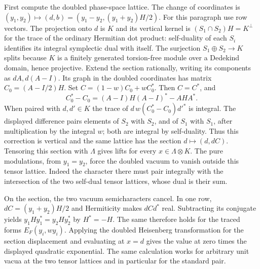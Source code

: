 First compute the doubled phase-space lattice. The change of
coordinates is $(y_1,y_2)\mapsto(d,b)=(y_1-y_2,(y_1+y_2)H/2)$.
For this paragraph use row vectors. The projection onto $d$ is
$K$ and its vertical kernel is $(S_1\cap S_2)H=K^\perp$ for
the trace of the ordinary Hermitian dot product: self-duality of
each $S_i$ identifies its integral symplectic dual with itself.
The surjection $S_1\oplus S_2\to K$ splits because $K$ is a
finitely generated torsion-free module over a Dedekind domain,
hence projective. Extend the section rationally, writing its
components as $dA,d(A-I)$. Its graph in the doubled coordinates
has matrix $C_0=(A-I/2)H$. Set $C=(1-w)C_0+wC_0^*$.
Then $C=C^*$, and
\[
 C_0^*-C_0=(A-I)H(A-I)^*-AHA^* .
\]
When paired with $d,d'\in K$ the trace of
$d\,w(C_0^*-C_0)d'^*$ is integral. The displayed difference
pairs elements of $S_2$ with $S_2$, and of $S_1$ with $S_1$,
after multiplication by the integral $w$; both are integral by
self-duality. Thus this correction is vertical and the same
lattice has the section $d\mapsto(d,dC)$. Tensoring this section
with $\Lambda$ gives lifts for every $x\in\Lambda\otimes K$.
The pure modulations, from $y_1=y_2$, force the doubled vacuum
to vanish outside this tensor lattice. Indeed the character
there must pair integrally with the intersection of the two
self-dual tensor lattices, whose dual is their sum.

On the section, the two vacuum semicharacters cancel. In one row,
$dC=(y_1+y_2)H/2$ and Hermiticity makes $dCd^*$ real.
Subtracting its conjugate yields $y_1Hy_1^*=y_2Hy_2^*$ by
$H^*=-H$. The same therefore holds for the traced forms
$E_F(y_i,w y_i)$. Applying the doubled Heisenberg transformation
for the section displacement and evaluating at $x=d$ gives the
value at zero times the displayed quadratic exponential. The same
calculation works for arbitrary unit vacua at the two tensor
lattices and in particular for the standard pair.

